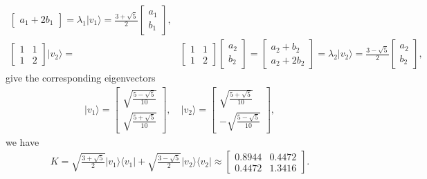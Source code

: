 \documentclass[en]{sol-man}
\begin{document}
\begin{sol}
\begin{align}
\begin{bmatrix}
            a_1+2b_1
        \end{bmatrix}=\lambda_1\lvert v_1\rangle=\frac{3+\sqrt{5}}{2}\begin{bmatrix}
            a_1\\
            b_1
        \end{bmatrix},\\
        \begin{bmatrix}
            1&1\\
            1&2
        \end{bmatrix}\lvert v_2\rangle=&\begin{bmatrix}
            1&1\\
            1&2
        \end{bmatrix}\begin{bmatrix}
            a_2\\
            b_2
        \end{bmatrix}=\begin{bmatrix}
            a_2+b_2\\
            a_2+2b_2
        \end{bmatrix}=\lambda_2\lvert v_2\rangle=\frac{3-\sqrt{5}}{2}\begin{bmatrix}
            a_2\\
            b_2
        \end{bmatrix},
    \end{align}
    give the corresponding eigenvectors
    \begin{align}
        \lvert v_1\rangle=\begin{bmatrix}
            \sqrt{\frac{5-\sqrt{5}}{10}}\\
            \sqrt{\frac{5+\sqrt{5}}{10}}
        \end{bmatrix},\quad\lvert v_2\rangle=\begin{bmatrix}
            \sqrt{\frac{5+\sqrt{5}}{10}}\\
            -\sqrt{\frac{5-\sqrt{5}}{10}}
        \end{bmatrix},
    \end{align}
    we have
    \begin{align}
        K=\sqrt{\frac{3+\sqrt{5}}{2}}\lvert v_1\rangle\langle v_1\rvert+\sqrt{\frac{3-\sqrt{5}}{2}}\lvert v_2\rangle\langle v_2\rvert\approx\begin{bmatrix}
            0.8944&0.4472\\
            0.4472&1.3416
        \end{bmatrix}.
    \end{align}
\end{sol}
\end{document}
